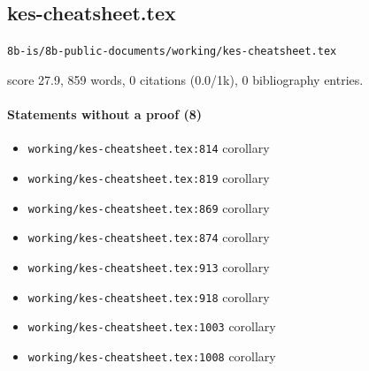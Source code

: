 \documentclass[11pt]{article}
\newcommand{\loc}[1]{{\small\color{muted}\texttt{#1}}}
\begin{document}
\subsection{kes-cheatsheet.tex}
\loc{8b-is/\allowbreak{}8b-public-documents/\allowbreak{}working/\allowbreak{}kes-cheatsheet.tex}\par
score 27.9, 859 words, 0 citations (0.0/1k), 0 bibliography entries.

\paragraph{Statements without a proof (8)}
\begin{itemize}
\item \loc{working/\allowbreak{}kes-cheatsheet.tex:814} corollary
\item \loc{working/\allowbreak{}kes-cheatsheet.tex:819} corollary
\item \loc{working/\allowbreak{}kes-cheatsheet.tex:869} corollary
\item \loc{working/\allowbreak{}kes-cheatsheet.tex:874} corollary
\item \loc{working/\allowbreak{}kes-cheatsheet.tex:913} corollary
\item \loc{working/\allowbreak{}kes-cheatsheet.tex:918} corollary
\item \loc{working/\allowbreak{}kes-cheatsheet.tex:1003} corollary
\item \loc{working/\allowbreak{}kes-cheatsheet.tex:1008} corollary
\end{itemize}
\end{document}

